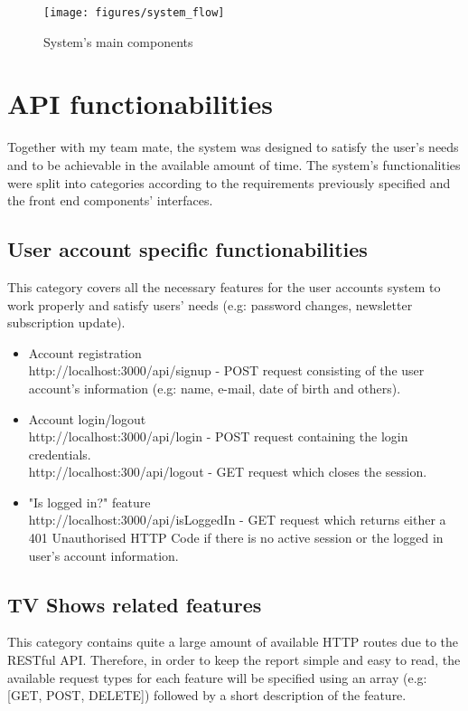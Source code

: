 \begin{figure}[h]
\caption{System's main components}
\centering
\texttt{[image: figures/system\_flow]}
\label{fig:systemflow}
\end{figure}

\section{API functionabilities}

Together with my team mate, the system was designed to satisfy the user's needs and to be achievable in the available amount of time. The system's functionalities were split into categories according to the requirements previously specified and the front end components' interfaces.

\subsection{User account specific functionabilities}

This category covers all the necessary features for the user accounts system to work properly and satisfy users' needs (e.g: password changes, newsletter subscription update).

\begin{itemize}
    \item Account registration\\[1ex] http://localhost:3000/api/signup - POST request consisting of the user account's information (e.g: name, e-mail, date of birth and others).
    \item Account login/logout\\[1ex]
    http://localhost:3000/api/login - POST request containing the login credentials.\\[1ex]
    http://localhost:300/api/logout - GET request which closes the session.
    \item "Is logged in?" feature\\[1ex] http://localhost:3000/api/isLoggedIn - GET request which returns either a 401 Unauthorised HTTP Code if there is no active session or the logged in user's account information.
\end{itemize}

\subsection{TV Shows related features}

This category contains quite a large amount of available HTTP routes due to the RESTful API. Therefore, in order to keep the report simple and easy to read, the available request types for each feature will be specified using an array (e.g: [GET, POST, DELETE]) followed by a short description of the feature.

